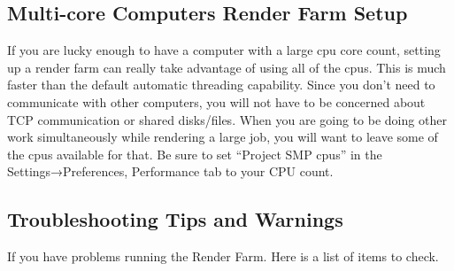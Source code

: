 \subsection{Multi-core Computers Render Farm Setup}%
\label{sub:multi_core_render_farm_setup}

If you are lucky enough to have a computer with a large cpu core
count, setting up a render farm can really take advantage of using
all of the cpus. This is much faster than the default automatic
threading capability. Since you don’t need to communicate with other
computers, you will not have to be concerned about TCP communication
or shared disks/files. When you are going to be doing other work
simultaneously while rendering a large job, you will want to leave
some of the cpus available for that.  Be sure to set “Project SMP
cpus” in the Settings→Preferences, Performance tab to your CPU
count.

\subsection{Troubleshooting Tips and Warnings}%
\label{sub:troubleshhoting_tips_warnings}

\noindent If you have problems running the Render Farm.  Here is a
list of items to check.

